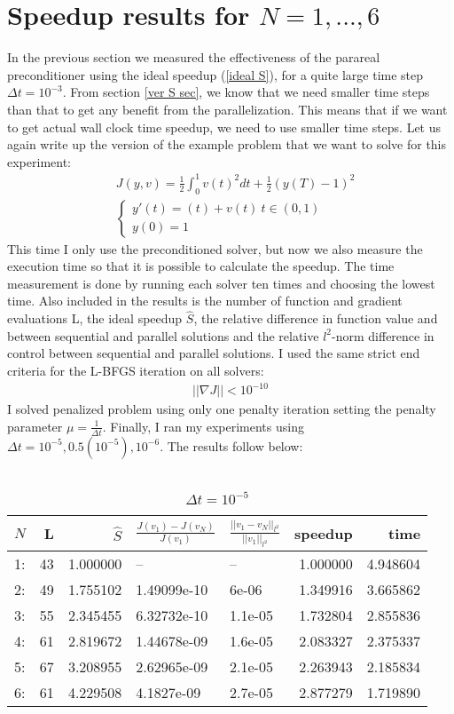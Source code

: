 \section{Speedup results for $N=1,...,6$}
In the previous section we measured the effectiveness of the parareal preconditioner using the ideal speedup (\ref{ideal S}), for a quite large time step $\Delta t =10^{-3}$. From section \ref{ver S sec}, we know that we need smaller time steps than that to get any benefit from the parallelization. This means that if we want to get actual wall clock time speedup, we need to use smaller time steps. Let us again write up the version of the example problem that we want to solve for this experiment:
\begin{align*}
&J(y,v) = \frac{1}{2}\int_0^1v(t)^2dt + \frac{1}{2}(y(T)-1)^2 \\
&\left\{
     \begin{array}{lr}
       	y'(t)=(t) + v(t) \ t\in(0,1)\\
       	y(0)=1
     \end{array}
   \right. 
\end{align*}
This time I only use the preconditioned solver, but now we also measure the execution time so that it is possible to calculate the speedup. The time measurement is done by running each solver ten times and choosing the lowest time. Also included in the results is the number of function and gradient evaluations L, the ideal speedup $\hat S$, the relative difference in function value and between sequential and parallel solutions and the relative $l^2$-norm difference in control between sequential and parallel solutions. I used the same strict end criteria for the L-BFGS iteration on all solvers:
\begin{align*}
||\nabla J||<10^{-10}
\end{align*}
I solved penalized problem using only one penalty iteration setting the penalty parameter $\mu=\frac{1}{\Delta t}$. Finally, I ran my experiments using $\Delta t =10^{-5},0.5(10^{-5}),10^{-6}$. The results follow below:
\\
\\
\begin{table}[h]
\centering
\caption{$\Delta t = 10^{-5}$}
\begin{tabular}{lrrllrr}
\toprule
{} $N$&   L &        $\hat S$ &          $\frac{J(v_1)-J(v_N)}{J(v_1)}$ &    $\frac{||v_1-v_N||_{l^2}}{||v_1||_{l^2}}$&   speedup &      time \\
\midrule
1: &  43 &  1.000000 &           -- &       -- &  1.000000 &  4.948604 \\
2: &  49 &  1.755102 &  1.49099e-10 &    6e-06 &  1.349916 &  3.665862 \\
3: &  55 &  2.345455 &  6.32732e-10 &  1.1e-05 &  1.732804 &  2.855836 \\
4: &  61 &  2.819672 &  1.44678e-09 &  1.6e-05 &  2.083327 &  2.375337 \\
5: &  67 &  3.208955 &  2.62965e-09 &  2.1e-05 &  2.263943 &  2.185834 \\
6: &  61 &  4.229508 &   4.1827e-09 &  2.7e-05 &  2.877279 &  1.719890 \\
\bottomrule
\end{tabular}
\end{table}
